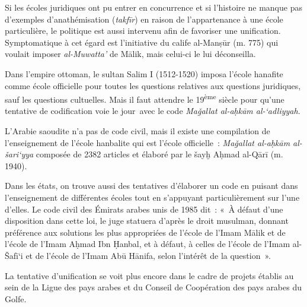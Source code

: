 
Si les écoles juridiques ont pu entrer en concurrence et si l'histoire
ne manque pas d'exemples d'anathémisation (\emph{takfīr}) en raison de
l'appartenance à une école particulière, le politique est aussi
intervenu afin de favoriser une unification. Symptomatique à cet égard
est l'initiative du calife al-Manṣūr (m. 775) qui voulait imposer
\emph{al-Muwatta'} de Mālik, mais celui-ci le lui déconseilla.

Dans l'empire ottoman, le sultan Salim I (1512-1520) imposa l'école
hanafite comme école officielle pour toutes les questions relatives aux
questions juridiques, sauf les questions cultuelles. Mais il faut
attendre le 19\textsuperscript{ème} siècle pour qu'une tentative de
codification voie le jour~avec le code \emph{Maǧallat al-aḥkām
al-`adliyyah}.

L'Arabie saoudite n'a pas de code civil, mais il existe une compilation
de l'enseignement de l'école hanbalite qui est l'école officielle~:
\emph{Maǧallat al-aḥkām al-šari`yya} composée de 2382 articles et
élaboré par le šayḫ Aḥmad al-Qārī (m. 1940).

Dans les états, on trouve aussi des tentatives d'élaborer un code en
puisant dans l'enseignement de différentes écoles tout en s'appuyant
particulièrement sur l'une d'elles. Le code civil des Émirats arabes
unis de 1985 dit~: «~À défaut d'une disposition dans cette loi, le juge
statuera d'après le droit musulman, donnant préférence aux solutions les
plus appropriées de l'école de l'Imam Mālik et de l'école de l'Imam
Aḥmad Ibn Ḥanbal, et à défaut, à celles de l'école de l'Imam al-Šafī`i
et de l'école de l'Imam Abū Hānifa, selon l'intérêt de la question~».

La tentative d'unification se voit plus encore dans le cadre de projets
établis au sein de la Ligue des pays arabes et du Conseil de Coopération
des pays arabes du Golfe.


